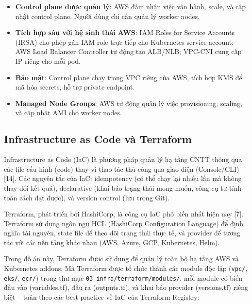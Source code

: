 \documentclass[13pt,a4paper,twoside]{extarticle}
\begin{document}
\begin{itemize}[leftmargin=*,nosep]
  \item \textbf{Control plane được quản lý}: AWS đảm nhận việc vận hành, scale, và cập nhật control plane. Người dùng chỉ cần quản lý worker nodes.
  \item \textbf{Tích hợp sâu với hệ sinh thái AWS}: IAM Roles for Service Accounts (IRSA) cho phép gán IAM role trực tiếp cho Kubernetes service account; AWS Load Balancer Controller tự động tạo ALB/NLB; VPC-CNI cung cấp IP riêng cho mỗi pod.
  \item \textbf{Bảo mật}: Control plane chạy trong VPC riêng của AWS, tích hợp KMS để mã hóa secrets, hỗ trợ private endpoint.
  \item \textbf{Managed Node Groups}: AWS tự động quản lý việc provisioning, scaling, và cập nhật AMI cho worker nodes.
\end{itemize}

\subsection{Infrastructure as Code và Terraform}

Infrastructure as Code (IaC) là phương pháp quản lý hạ tầng CNTT thông qua các file cấu hình (code) thay vì thao tác thủ công qua giao diện (Console/CLI) [14]. Các nguyên tắc của IaC: idempotency (có thể chạy lại nhiều lần mà không thay đổi kết quả), declarative (khai báo trạng thái mong muốn, công cụ tự tính toán cách đạt được), và version control (lưu trong Git).

Terraform, phát triển bởi HashiCorp, là công cụ IaC phổ biến nhất hiện nay [7]. Terraform sử dụng ngôn ngữ HCL (HashiCorp Configuration Language) để định nghĩa tài nguyên, state file để theo dõi trạng thái thực tế, và provider để tương tác với các nền tảng khác nhau (AWS, Azure, GCP, Kubernetes, Helm).

Trong đồ án này, Terraform được sử dụng để quản lý toàn bộ hạ tầng AWS và Kubernetes addons. Mã Terraform được tổ chức thành các module độc lập (\texttt{vpc/}, \texttt{eks/}, \texttt{ecr/}) trong thư mục \texttt{03-infra/terraform/modules/}, mỗi module có biến đầu vào (variables.tf), đầu ra (outputs.tf), và khai báo provider (versions.tf) riêng biệt -- tuân theo các best practice về IaC của Terraform Registry:
\end{document}
